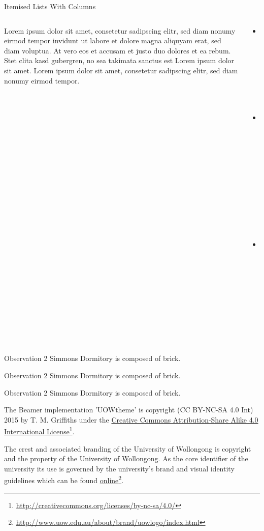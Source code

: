 \documentclass[]{beamer}
\begin{document}
\begin{frame}{Itemised Lists With Columns}
   \begin{columns}[T]
      \begin{column}{0.48\textwidth}
      Lorem ipsum dolor sit amet, consetetur sadipscing elitr, sed diam nonumy eirmod tempor invidunt ut labore et dolore magna aliquyam erat, sed diam voluptua. At vero eos et accusam et justo duo dolores et ea rebum. Stet clita kasd gubergren, no sea takimata sanctus est Lorem ipsum dolor sit amet. Lorem ipsum dolor sit amet, consetetur sadipscing elitr, sed diam nonumy eirmod tempor.
      \end{column}
      \begin{column}{0.48\textwidth}
      \begin{itemize}
         \item One point
         \item Another point
         \item And a \alert{third}!
      \end{itemize}
      \end{column}
   \end{columns}
\end{frame}


\begin{frame}
   \begin{block}{Observation 2}
   Simmons Dormitory is composed of brick.
   \end{block}
\end{frame}


\begin{frame}
   \begin{alertblock}{Observation 2}
   Simmons Dormitory is composed of brick.
   \end{alertblock}
\end{frame}


\begin{frame}
   \begin{exampleblock}{Observation 2}
   Simmons Dormitory is composed of brick.
   \end{exampleblock}
\end{frame}


\begin{frame}\footnotesize
   The Beamer implementation 'UOWtheme' is copyright (CC BY-NC-SA 4.0 Int) 2015 by T. M. Griffiths under the \href{http://creativecommons.org/licenses/by-sa/4.0/}{Creative Commons Attribution-Share Alike 4.0 International License}\footnote{\url{http://creativecommons.org/licenses/by-nc-sa/4.0/}}.
   
   \begin{center}\ccbysa\end{center}
   
   The crest and associated branding of the University of Wollongong is copyright and the property of the University of Wollongong. As the core identifier of the university its use is governed by the university's brand and visual identity guidelines which can be found \href{http://www.uow.edu.au/about/brand/uowlogo/index.html}{online}\footnote{\url{http://www.uow.edu.au/about/brand/uowlogo/index.html}}.
   
\end{frame}
\end{document}
